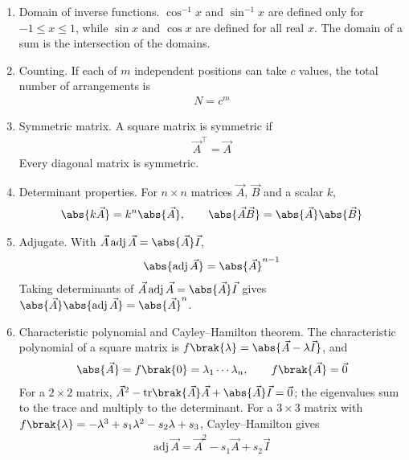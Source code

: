 \begin{enumerate}[label=\thesubsection.\arabic*, ref=\thesubsection.\theenumi]
\item Domain of inverse functions. $\cos^{-1}x$ and $\sin^{-1}x$ are defined only for $-1 \le x \le 1$, while $\sin x$ and $\cos x$ are defined for all real $x$. The domain of a sum is the intersection of the domains. 
\item Counting. If each of $m$ independent positions can take $c$ values, the total number of arrangements is
\begin{align}
	N = c^m \label{eq:CBSE12-count}
\end{align}
\item Symmetric matrix. A square matrix is symmetric if
\begin{align}
	\vec{A}^{\top} = \vec{A} \label{eq:CBSE12-symmetric}
\end{align}
Every diagonal matrix is symmetric.
\item Determinant properties. For $n\times n$ matrices $\vec{A}$, $\vec{B}$ and a scalar $k$,
\begin{align}
	\abs{k\vec{A}} = k^n\abs{\vec{A}}, \qquad \abs{\vec{A}\vec{B}} = \abs{\vec{A}}\abs{\vec{B}} \label{eq:CBSE12-det}
\end{align}
\item Adjugate. With $\vec{A}\,\text{adj}\,\vec{A} = \abs{\vec{A}}\vec{I}$,
\begin{align}
	\abs{\text{adj}\,\vec{A}} = \abs{\vec{A}}^{n-1} \label{eq:CBSE12-adj}
\end{align}
\solution
Taking determinants of $\vec{A}\,\text{adj}\,\vec{A} = \abs{\vec{A}}\vec{I}$ gives $\abs{\vec{A}}\abs{\text{adj}\,\vec{A}} = \abs{\vec{A}}^n$. 
\item Characteristic polynomial and Cayley--Hamilton theorem. The characteristic polynomial of a square matrix is $f\brak{\lambda} = \abs{\vec{A} - \lambda\vec{I}}$, and
\begin{align}
	\abs{\vec{A}} = f\brak{0} = \lambda_1\cdots\lambda_n, \qquad f\brak{\vec{A}} = \vec{0} \label{eq:CBSE12-ch}
\end{align}
For a $2\times2$ matrix, $\vec{A}^2 - \text{tr}\brak{\vec{A}}\vec{A} + \abs{\vec{A}}\vec{I} = \vec{0}$; the eigenvalues sum to the trace and multiply to the determinant. For a $3\times3$ matrix with $f\brak{\lambda} = -\lambda^3 + s_1\lambda^2 - s_2\lambda + s_3$, Cayley--Hamilton gives
\begin{align}
	\text{adj}\,\vec{A} = \vec{A}^2 - s_1\vec{A} + s_2\vec{I} \label{eq:CBSE12-adjch}

\end{align}
\end{enumerate}
